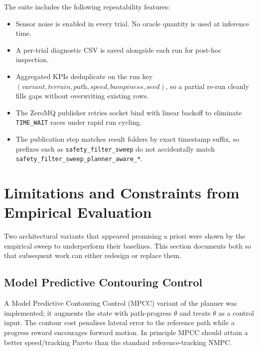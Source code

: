 \documentclass[conference,letterpaper,10pt]{IEEEtran}
\begin{document}
The suite includes the following repeatability features:
\begin{itemize}
  \item Sensor noise is enabled in every trial. No oracle quantity
        is used at inference time.
  \item A per-trial diagnostic CSV is saved alongside each run for
        post-hoc inspection.
  \item Aggregated KPIs deduplicate on the run key
        $(\textit{variant}, \textit{terrain}, \textit{path},
        \textit{speed}, \textit{bumpiness}, \textit{seed})$, so a
        partial re-run cleanly fills gaps without overwriting
        existing rows.
  \item The ZeroMQ publisher retries socket bind with linear
        backoff to eliminate \texttt{TIME\_WAIT} races under rapid
        run cycling.
  \item The publication step matches result folders by exact
        timestamp suffix, so prefixes such as
        \texttt{safety\_filter\_sweep} do not accidentally match
        \texttt{safety\_filter\_sweep\_planner\_aware\_*}.
\end{itemize}

\section{Limitations and Constraints from Empirical Evaluation}
\label{sec:negative}

Two architectural variants that appeared promising a priori were
shown by the empirical sweep to underperform their baselines.
This section documents both so that subsequent work can either
redesign or replace them.

\subsection{Model Predictive Contouring Control}
\label{sec:mpcc_negative}

A Model Predictive Contouring Control (MPCC) variant of the planner
was implemented; it augments the state with path-progress $\theta$
and treats $\dot \theta$ as a control input. The contour cost
penalises lateral error to the reference path while a progress
reward encourages forward motion. In principle MPCC should attain
a better speed/tracking Pareto than the standard reference-tracking
NMPC.
\end{document}
